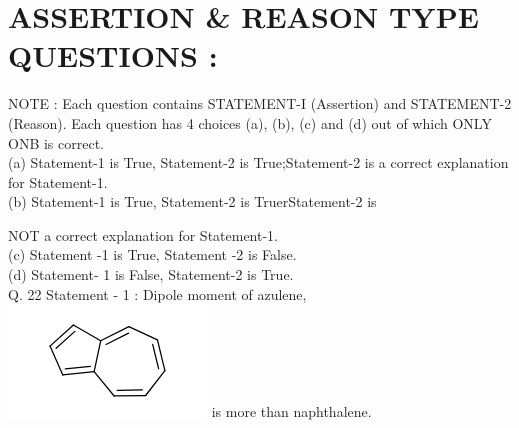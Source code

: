 \documentclass[10pt]{article}
\begin{document}
\section*{ASSERTION \& REASON TYPE QUESTIONS :}
NOTE : Each question contains STATEMENT-I (Assertion) and STATEMENT-2 (Reason). Each question has 4 choices (a), (b), (c) and (d) out of which ONLY ONB is correct.\\
(a) Statement-1 is True, Statement-2 is True;Statement-2 is a correct explanation for Statement-1.\\
(b) Statement-1 is True, Statement-2 is TruerStatement-2 is

NOT a correct explanation for Statement-1.\\
(c) Statement -1 is True, Statement -2 is False.\\
(d) Statement- 1 is False, Statement-2 is True.\\
Q. 22 Statement - 1 : Dipole moment of azulene,\\
\includegraphics{smile-2b1bf85fb534b972240674ba56695912307d2bd3} is more than naphthalene.
\end{document}
